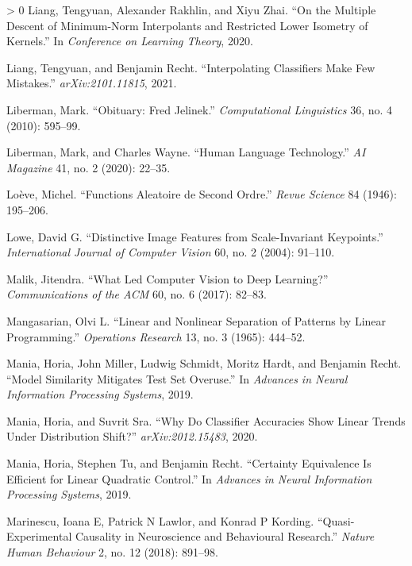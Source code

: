\documentclass{tufte-book}
\newlength{\cslhangindent}
\newenvironment{CSLReferences}[3] %
 {%
  \setlength{\parindent}{0pt}
  \ifodd #1 \everypar{\setlength{\hangindent}{\cslhangindent}}\ignorespaces\fi
  \ifnum #2 > 0
  \setlength{\parskip}{#3\baselineskip}
  \fi
 }%
 {
 }
\begin{document}
\begin{CSLReferences}{1}{0}
\leavevmode\hypertarget{ref-Liang2020}{}%
Liang, Tengyuan, Alexander Rakhlin, and Xiyu Zhai. {``On the Multiple
Descent of Minimum-Norm Interpolants and Restricted Lower Isometry of
Kernels.''} In \emph{Conference on Learning Theory}, 2020.

\leavevmode\hypertarget{ref-LiangRecht2021}{}%
Liang, Tengyuan, and Benjamin Recht. {``Interpolating Classifiers Make
Few Mistakes.''} \emph{arXiv:2101.11815}, 2021.

\leavevmode\hypertarget{ref-Liberman10}{}%
Liberman, Mark. {``Obituary: {F}red {J}elinek.''} \emph{Computational
Linguistics} 36, no. 4 (2010): 595--99.

\leavevmode\hypertarget{ref-Liberman20}{}%
Liberman, Mark, and Charles Wayne. {``Human Language Technology.''}
\emph{{AI} Magazine} 41, no. 2 (2020): 22--35.

\leavevmode\hypertarget{ref-loeve1946functions}{}%
Loève, Michel. {``Functions Aleatoire de Second Ordre.''} \emph{Revue
Science} 84 (1946): 195--206.

\leavevmode\hypertarget{ref-lowe2004distinctive}{}%
Lowe, David G. {``Distinctive Image Features from Scale-Invariant
Keypoints.''} \emph{International Journal of Computer Vision} 60, no. 2
(2004): 91--110.

\leavevmode\hypertarget{ref-MalikCACM}{}%
Malik, Jitendra. {``What Led Computer Vision to Deep Learning?''}
\emph{Communications of the {ACM}} 60, no. 6 (2017): 82--83.

\leavevmode\hypertarget{ref-mangasarian1965linear}{}%
Mangasarian, Olvi L. {``Linear and Nonlinear Separation of Patterns by
Linear Programming.''} \emph{Operations Research} 13, no. 3 (1965):
444--52.

\leavevmode\hypertarget{ref-Mania-Model-Sim}{}%
Mania, Horia, John Miller, Ludwig Schmidt, Moritz Hardt, and Benjamin
Recht. {``Model Similarity Mitigates Test Set Overuse.''} In
\emph{Advances in Neural Information Processing Systems}, 2019.

\leavevmode\hypertarget{ref-mania-sra}{}%
Mania, Horia, and Suvrit Sra. {``Why Do Classifier Accuracies Show
Linear Trends Under Distribution Shift?''} \emph{arXiv:2012.15483},
2020.

\leavevmode\hypertarget{ref-Mania19}{}%
Mania, Horia, Stephen Tu, and Benjamin Recht. {``Certainty Equivalence
Is Efficient for Linear Quadratic Control.''} In \emph{Advances in
Neural Information Processing Systems}, 2019.

\leavevmode\hypertarget{ref-marinescu2018quasi}{}%
Marinescu, Ioana E, Patrick N Lawlor, and Konrad P Kording.
{``Quasi-Experimental Causality in Neuroscience and Behavioural
Research.''} \emph{Nature Human Behaviour} 2, no. 12 (2018): 891--98.


\end{CSLReferences}
\end{document}
